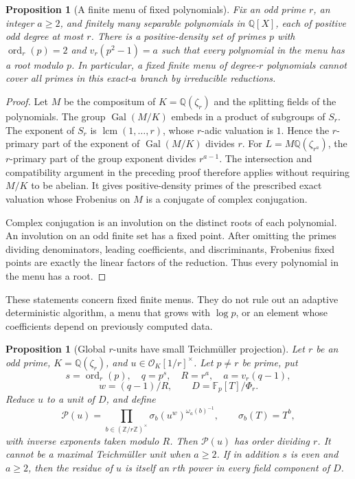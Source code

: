 \documentclass[11pt]{article}
\newcommand{\ord}{\operatorname{ord}}
\newtheorem{proposition}[theorem]{Proposition}
\theoremstyle{definition}
\theoremstyle{remark}
\begin{document}
\begin{proposition}[A finite menu of fixed polynomials]
\label{prop:fixed-polynomial-menu}
Fix an odd prime $r$, an integer $a\ge2$, and finitely many
separable polynomials in $\mathbb Q[X]$, each of positive odd
degree at most $r$.
There is a positive-density set of primes $p$ with
$\ord_r(p)=2$ and $v_r(p^2-1)=a$ such that every polynomial
in the menu has a root modulo $p$.
In particular, a fixed finite menu of degree-$r$ polynomials
cannot cover all primes in this exact-$a$ branch by irreducible
reductions.
\end{proposition}

\begin{proof}
Let $M$ be the compositum of $K=\mathbb Q(\zeta_r)$ and the
splitting fields of the polynomials.
The group $\operatorname{Gal}(M/K)$ embeds in a product of
subgroups of $S_r$. The exponent of $S_r$ is
$\operatorname{lcm}(1,\ldots,r)$, whose $r$-adic valuation is
$1$. Hence the $r$-primary part of the exponent of
$\operatorname{Gal}(M/K)$ divides $r$.
For $L=M\mathbb Q(\zeta_{r^a})$, the $r$-primary part of the
group exponent divides $r^{a-1}$.
The intersection and compatibility argument in the preceding
proof therefore applies without requiring $M/K$ to be abelian.
It gives positive-density primes of the prescribed exact
valuation whose Frobenius on $M$ is a conjugate of complex
conjugation.

Complex conjugation is an involution on the distinct roots of
each polynomial. An involution on an odd finite set has a fixed
point. After omitting the primes dividing denominators, leading
coefficients, and discriminants, Frobenius fixed points are
exactly the linear factors of the reduction.
Thus every polynomial in the menu has a root.
\end{proof}

These statements concern fixed finite menus. They do not rule out
an adaptive deterministic algorithm, a menu that grows with
$\log p$, or an element whose coefficients depend on previously
computed data.

\begin{proposition}[Global $r$-units have small Teichm\"uller projection]
\label{prop:global-unit-teich-barrier}
Let $r$ be an odd prime, $K=\mathbb Q(\zeta_r)$, and
$u\in\mathcal O_K[1/r]^\times$.
Let $p\ne r$ be prime, put
\[
 s=\ord_r(p),\quad q=p^s,\quad R=r^a,\quad
 a=v_r(q-1),
\]
\[
 w=(q-1)/R,\qquad D=\mathbb F_p[T]/\Phi_r.
\]
Reduce $u$ to a unit of $D$, and define
\[
 \mathcal P(u)=
 \prod_{b\in(\mathbb Z/r\mathbb Z)^\times}
 \sigma_b(u^w)^{\omega_a(b)^{-1}},
 \qquad \sigma_b(T)=T^b,
\]
with inverse exponents taken modulo $R$.
Then $\mathcal P(u)$ has order dividing $r$.
It cannot be a maximal Teichm\"uller unit when $a\ge2$.
If in addition $s$ is even and $a\ge2$, then the residue of $u$
is itself an $r$th power in every field component of $D$.
\end{proposition}
\end{document}
